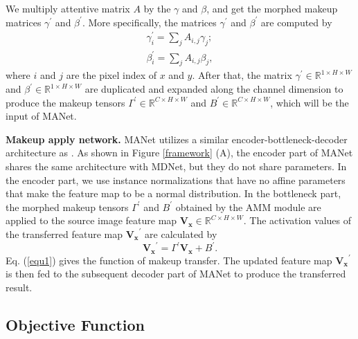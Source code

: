 We multiply attentive matrix $A$ by the $\gamma$ and $\beta$, and get the morphed makeup matrices $\gamma^{\prime}$ and $\beta^{\prime}$. 
More specifically, the matrices $\gamma^\prime$ and $\beta^\prime$ are computed by
\begin{equation}
\begin{split}
\gamma^\prime_i = \sum_{j} A_{i, j} \gamma_j ; \\
\beta^\prime_i = \sum_{j} A_{i, j} \beta_j ,
\label{equ4}
\end{split}
\end{equation}
where $i$ and $j$ are the pixel index of $x$ and $y$. After that, the matrix $\gamma^{\prime}  \in \mathbb{R}^{1 \times H \times W}$ and $\beta^{\prime} \in \mathbb{R}^{1 \times H \times W}$ are duplicated and expanded along the channel dimension to produce the makeup tensors $\Gamma^{\prime}  \in \mathbb{R}^{C \times H \times W}$ and $B^{\prime}  \in \mathbb{R}^{C \times H \times W}$, which will be the input of MANet.

\textbf{Makeup apply network.} MANet utilizes a similar encoder-bottleneck-decoder architecture as \cite{Choi2017StarGANUG}. As shown in Figure \ref{framework} (A), the encoder part of MANet shares the same architecture with MDNet, but they do not share parameters.
In the encoder part, we use instance normalizations that have no affine parameters that make the feature map to be a normal distribution.
In the bottleneck part, the morphed makeup tensors $\Gamma^{\prime}$ and $B^{\prime}$ obtained by the AMM module are applied to the source image feature map $\mathbf{V_x}\in \mathbb{R}^{C \times H \times W}$. 
The activation values of the transferred feature map $\mathbf{V_x}^{\prime}$ are calculated by
\begin{equation}
\mathbf{V_x}^{\prime} = \Gamma^{\prime} \mathbf{V_x} +B ^{\prime}.
\label{equ1}
\end{equation}
Eq. (\ref{equ1}) gives the function of makeup transfer. The updated feature map $\mathbf{V_x}^{\prime}$ is then fed to the subsequent decoder part of MANet to produce the transferred result.

\subsection{Objective Function}

